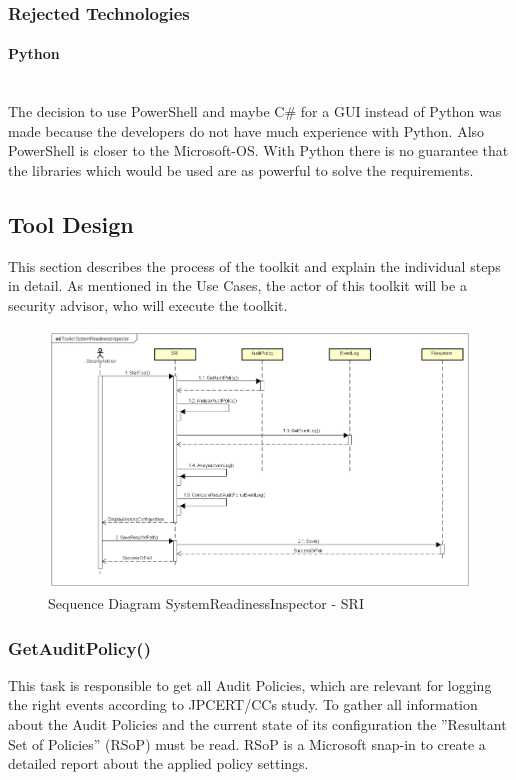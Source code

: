 \subsubsection{Rejected Technologies}

\paragraph{Python}\ \\
The decision to use PowerShell and maybe C\# for a GUI instead of Python was made because the developers do not have much experience with Python. Also PowerShell is closer to the Microsoft-OS. With Python there is no guarantee that the libraries which would be used are as powerful to solve the requirements.


\clearpage

\subsection{Tool Design}
This section describes the process of the toolkit and explain the individual steps in detail. As mentioned in the Use Cases, the actor of this toolkit will be a security advisor, who will execute the toolkit.

\begin{figure}[H]
    \centering
    \includegraphics[width=0.8\linewidth]{assets/design-tool/SequenceDiagramSRI.png}
    \caption{Sequence Diagram SystemReadinessInspector - SRI}
\end{figure}

\subsubsection{GetAuditPolicy()}
This task is responsible to get all Audit Policies, which are relevant for logging the right events according to JPCERT/CCs study. To gather all information about the Audit Policies and the current state of its configuration  the ''Resultant Set of Policies'' (RSoP) must be read. \cite{RSoP} RSoP is a Microsoft snap-in to create a detailed report about the applied policy settings. 

